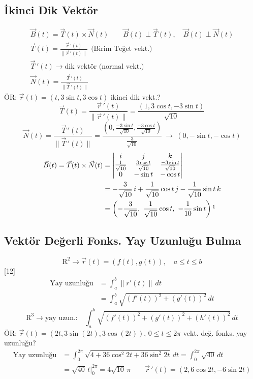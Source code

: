 \documentclass[11pt,a4paper]{article}
\begin{document}
\subsection{İkinci Dik Vektör}
\begin{gather*}
\vec B(t)=\vec T(t)\times\vec N(t)\qquad \vec B(t)\perp\vec T(t),\quad \vec B(t)\perp\vec N(t)\\
\vec T(t)=\frac{\vec r\,'(t)}{\|\vec r\,'(t)\|}\ \ \text{(Birim Teğet vekt.)}\\
\vec T\,'(t)\to\text{dik vektör (normal vekt.)}\\
\vec N(t)=\frac{\vec T\,'(t)}{\|\vec T\,'(t)\|}
\end{gather*}
ÖR: $\vec r(t)=(t,3\sin t,3\cos t)$ ikinci dik vekt.?
\[ \vec T(t)=\frac{\vec r\,'(t)}{\|\vec r\,'(t)\|}=\frac{(1,3\cos t,-3\sin t)}{\sqrt{10}} \]
\[ \vec N(t)=\frac{\vec T\,'(t)}{\|\vec T\,'(t)\|}=\frac{\left(0,\frac{-3\sin t}{\sqrt{10}},\frac{-3\cos t}{\sqrt{10}}\right)}{\frac{3}{\sqrt{10}}}\ \to\ (0,-\sin t,-\cos t) \]
\begin{align*}
\vec B(t)=\vec T(t)\times\vec N(t)&=\begin{vmatrix}i&j&k\\\frac{1}{\sqrt{10}}&\frac{3\cos t}{\sqrt{10}}&\frac{-3\sin t}{\sqrt{10}}\\0&-\sin t&-\cos t\end{vmatrix}\\
&=-\frac{3}{\sqrt{10}}\,i+\frac{1}{\sqrt{10}}\cos t\,j-\frac{1}{\sqrt{10}}\sin t\,k\\
&=\left(-\frac{3}{\sqrt{10}},\ \frac{1}{\sqrt{10}}\cos t,\ -\frac{1}{10}\sin t\right)\footnotemark
\end{align*}

\subsection{Vektör Değerli Fonks. Yay Uzunluğu Bulma}
\[ \mathrm{R}^2\to\vec r(t)=(f(t),g(t)),\quad a\le t\le b \]
[12]
\begin{align*}
\text{Yay uzunluğu}&=\int_a^b\|r'(t)\|\,dt\\
&=\int_a^b\sqrt{(f'(t))^2+(g'(t))^2}\,dt
\end{align*}
\[ \mathrm{R}^3\to\text{yay uzun.:}\quad \int_a^b\sqrt{(f'(t))^2+(g'(t))^2+(h'(t))^2}\,dt \]
ÖR: $\vec r(t)=(2t,3\sin(2t),3\cos(2t))$, $0\le t\le2\pi$ \quad {} vekt. değ. fonks. yay uzunluğu?
\begin{align*}
\text{Yay uzunluğu}&=\int_0^{2\pi}\sqrt{4+36\cos^2 2t+36\sin^2 2t}\,dt=\int_0^{2\pi}\sqrt{40}\,dt\\
&=\sqrt{40}\,t\Big|_0^{2\pi}=4\sqrt{10}\,\pi\qquad \vec r\,'(t)=(2,6\cos2t,-6\sin2t)
\end{align*}
\end{document}
